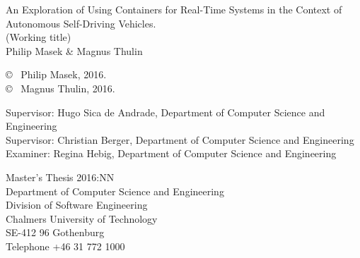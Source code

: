 \newpage
\thispagestyle{plain}
\vspace*{4.5cm}
An Exploration of Using Containers for Real-Time Systems in the Context of Autonomous Self-Driving Vehicles.\\
(Working title)\\
Philip Masek \& Magnus Thulin \setlength{\parskip}{1cm}

\copyright ~ Philip Masek, 2016. \setlength{\parskip}{1cm}\\[0.0cm]
\copyright ~ Magnus Thulin, 2016. \setlength{\parskip}{1cm}

Supervisor: Hugo Sica de Andrade, Department of Computer Science and Engineering\\Supervisor: Christian Berger, Department of Computer Science and Engineering\\
Examiner: Regina Hebig, Department of Computer Science and Engineering \setlength{\parskip}{1cm}

Master's Thesis 2016:NN\\	%
Department of Computer Science and Engineering\\
Division of Software Engineering\\
Chalmers University of Technology\\
SE-412 96 Gothenburg\\
Telephone +46 31 772 1000 \setlength{\parskip}{0.5cm}

\vfill
